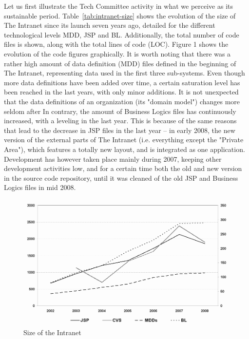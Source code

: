 \documentclass{acm_proc_article-sp}
\begin{document}
Let us first illustrate the Tech Committee activity in what we perceive as its sustainable period. Table~\ref{tab:intranet-size} shows the evolution of the size of The Intranet since its launch seven years ago, detailed for the different technological levels MDD, JSP and BL. Additionally, the total number of code files is shown, along with the total lines of code (LOC).  Figure 1 shows the evolution of the code figures graphically. It is worth noting that there was a rather high amount of data definition (MDD) files defined in the beginning of The Intranet, representing data used in the first three sub-systems. Even though more data definitions have been added over time, a certain saturation level has been reached in the last years, with only minor additions. It is not unexpected that the data definitions of an organization (its "domain model") changes more seldom after 
In contrary, the amount of Business Logics files has continuously increased, with a leveling in the last year. This is because of the same reasons that lead to the decrease in JSP files in the last year -- in early 2008, the new version of the external parts of The Intranet (i.e. everything except the "Private Area"), which features a totally new layout, and is integrated as one application. Development has however taken place mainly during 2007, keeping other development activities low, and for a certain time both the old and new version in the source code repository, until it was cleaned of the old JSP and Business Logics files in mid 2008.

\begin{figure}\label{fig:intranet-size}
  \includegraphics[width=0.98\columnwidth]{figures/SizeChart}
  \caption{Size of the Intranet}
\end{figure} 
\end{document}
